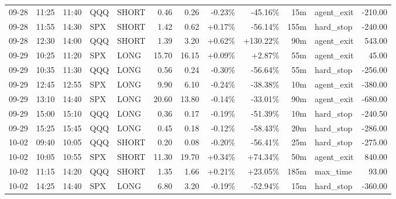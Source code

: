 \documentclass[11pt,a4paper,twoside]{article}
\begin{document}
\begin{center}
\begin{longtable}{>{\color{txtmain}}l l l l l r r r r r >{\color{txtmain}}l r}
09-28 & 11:25 & 11:40 & QQQ & SHORT & 0.46 & 0.26 & \textcolor{lossred}{-0.23\%} & \textcolor{lossred}{-45.16\%} & 15m & agent\_exit & \textcolor{lossred}{-210.00} \\
09-28 & 11:55 & 14:30 & SPX & SHORT & 1.42 & 0.62 & \textcolor{wingreen}{+0.17\%} & \textcolor{lossred}{-56.14\%} & 155m & hard\_stop & \textcolor{lossred}{-240.00} \\
09-28 & 12:30 & 14:00 & QQQ & SHORT & 1.39 & 3.20 & \textcolor{wingreen}{+0.62\%} & \textcolor{wingreen}{+130.22\%} & 90m & agent\_exit & \textcolor{wingreen}{543.00} \\
09-29 & 10:25 & 11:20 & SPX & LONG & 15.70 & 16.15 & \textcolor{wingreen}{+0.09\%} & \textcolor{wingreen}{+2.87\%} & 55m & agent\_exit & \textcolor{wingreen}{45.00} \\
09-29 & 10:35 & 11:30 & QQQ & LONG & 0.56 & 0.24 & \textcolor{lossred}{-0.30\%} & \textcolor{lossred}{-56.64\%} & 55m & hard\_stop & \textcolor{lossred}{-256.00} \\
09-29 & 12:45 & 12:55 & SPX & LONG & 9.90 & 6.10 & \textcolor{lossred}{-0.24\%} & \textcolor{lossred}{-38.38\%} & 10m & agent\_exit & \textcolor{lossred}{-380.00} \\
09-29 & 13:10 & 14:40 & SPX & LONG & 20.60 & 13.80 & \textcolor{lossred}{-0.14\%} & \textcolor{lossred}{-33.01\%} & 90m & agent\_exit & \textcolor{lossred}{-680.00} \\
09-29 & 15:00 & 15:10 & QQQ & LONG & 0.36 & 0.17 & \textcolor{lossred}{-0.19\%} & \textcolor{lossred}{-51.39\%} & 10m & hard\_stop & \textcolor{lossred}{-240.50} \\
09-29 & 15:25 & 15:45 & QQQ & LONG & 0.45 & 0.18 & \textcolor{lossred}{-0.12\%} & \textcolor{lossred}{-58.43\%} & 20m & hard\_stop & \textcolor{lossred}{-286.00} \\
10-02 & 09:40 & 10:05 & QQQ & SHORT & 0.20 & 0.08 & \textcolor{lossred}{-0.20\%} & \textcolor{lossred}{-56.41\%} & 25m & hard\_stop & \textcolor{lossred}{-275.00} \\
10-02 & 10:05 & 10:55 & SPX & SHORT & 11.30 & 19.70 & \textcolor{wingreen}{+0.34\%} & \textcolor{wingreen}{+74.34\%} & 50m & agent\_exit & \textcolor{wingreen}{840.00} \\
10-02 & 11:15 & 14:20 & QQQ & SHORT & 1.35 & 1.66 & \textcolor{wingreen}{+0.21\%} & \textcolor{wingreen}{+23.05\%} & 185m & max\_time & \textcolor{wingreen}{93.00} \\
10-02 & 14:25 & 14:40 & SPX & LONG & 6.80 & 3.20 & \textcolor{lossred}{-0.19\%} & \textcolor{lossred}{-52.94\%} & 15m & hard\_stop & \textcolor{lossred}{-360.00} \\

\end{longtable}
\end{center}
\end{document}
